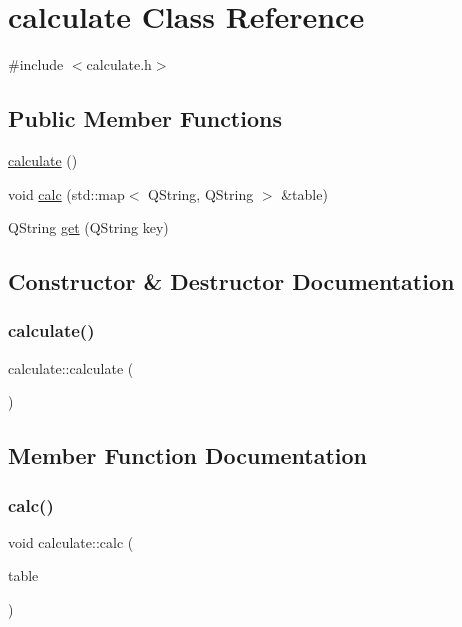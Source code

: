 \hypertarget{classcalculate}{}\section{calculate Class Reference}
\label{classcalculate}


{\ttfamily \#include $<$calculate.\+h$>$}

\subsection*{Public Member Functions}
\begin{DoxyCompactItemize}
\item 
\hyperlink{classcalculate_ae9ae84fe5b924e90d2eff41493319389}{calculate} ()
\item 
void \hyperlink{classcalculate_adf67800c10da97b39f6f05ac75a1004a}{calc} (std\+::map$<$ Q\+String, Q\+String $>$ \&table)
\item 
Q\+String \hyperlink{classcalculate_af19e3a32ffe1de21111b6bb167c1d905}{get} (Q\+String key)
\end{DoxyCompactItemize}


\subsection{Constructor \& Destructor Documentation}
\mbox{\label{classcalculate_ae9ae84fe5b924e90d2eff41493319389}} 
\subsubsection{\texorpdfstring{calculate()}{calculate()}}
{\footnotesize\ttfamily calculate\+::calculate (\begin{DoxyParamCaption}{ }\end{DoxyParamCaption})}



\subsection{Member Function Documentation}
\mbox{\label{classcalculate_adf67800c10da97b39f6f05ac75a1004a}} 
\subsubsection{\texorpdfstring{calc()}{calc()}}
{\footnotesize\ttfamily void calculate\+::calc (\begin{DoxyParamCaption}\item[{std\+::map$<$ Q\+String, Q\+String $>$ \&}]{table }\end{DoxyParamCaption})}

